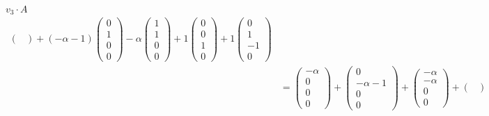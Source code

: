 \documentclass{article}
\begin{document}
\begin{enumerate}
\begin{mathcase}{\(v_3 \cdot A\)}
\[\begin{aligned}
\begin{pmatrix}
                    \end{pmatrix}
                    +(-\alpha - 1)
                    \begin{pmatrix}
                        0 \\ 1 \\ 0 \\ 0
                    \end{pmatrix}
                    -\alpha
                    \begin{pmatrix}
                        1 \\ 1 \\ 0 \\ 0
                    \end{pmatrix}
                    +1
                    \begin{pmatrix}
                        0 \\ 0 \\ 1 \\ 0
                    \end{pmatrix}
                    +1
                    \begin{pmatrix}
                        0 \\ 1 \\ -1 \\ 0
                    \end{pmatrix} 
                    \\
                    &=
                    \begin{pmatrix}
                        -\alpha \\ 0 \\ 0 \\ 0
                    \end{pmatrix}
                    +
                    \begin{pmatrix}
                        0 \\ -\alpha - 1 \\ 0 \\ 0
                    \end{pmatrix}
                    +
                    \begin{pmatrix}
                        -\alpha \\ -\alpha \\ 0 \\ 0
                    \end{pmatrix}
                    +
                    \begin{pmatrix}

\end{pmatrix}
\end{aligned}\]
\end{mathcase}
\end{enumerate}
\end{document}
